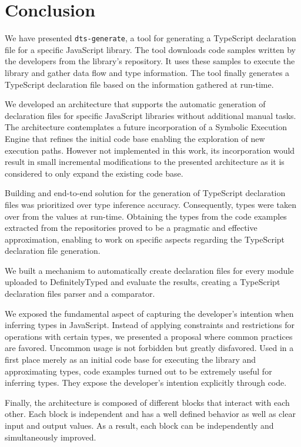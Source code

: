 \chapter{Conclusion}\label{chap:conclusion}

We have presented \texttt{dts-generate}, a tool for generating a TypeScript declaration file for a specific JavaScript library. The tool downloads code samples written by the developers from the library's repository. It uses these samples to execute the library and gather data flow and type information. The tool finally generates a TypeScript declaration file based on the information gathered at run-time.

We developed an architecture that supports the automatic generation of declaration files for specific JavaScript libraries without additional manual tasks. The architecture contemplates a future incorporation of a Symbolic Execution Engine that refines the initial code base enabling the exploration of new execution paths. However not implemented in this work, its incorporation would result in small incremental modifications to the presented architecture as it is considered to only expand the existing code base.

Building and end-to-end solution for the generation of TypeScript declaration files was prioritized over type inference accuracy. Consequently, types were taken over from the values at run-time. Obtaining the types from the code examples extracted from the repositories proved to be a pragmatic and effective approximation, enabling to work on specific aspects regarding the TypeScript declaration file generation.

We built a mechanism to automatically create declaration files for every module uploaded to DefinitelyTyped and evaluate the results, creating a TypeScript declaration files parser and a comparator.

We exposed the fundamental aspect of capturing the developer's intention when inferring types in JavaScript. Instead of applying constraints and restrictions for operations with certain types, we presented a proposal where common practices are favored. Uncommon usage is not forbidden but greatly disfavored. Used in a first place merely as an initial code base for executing the library and approximating types, code examples turned out to be extremely useful for inferring types. They expose the developer's intention explicitly through code.


Finally, the architecture is composed of different blocks that interact with each other. Each block is independent and has a well defined behavior as well as clear input and output values. As a result, each block can be independently and simultaneously improved.

